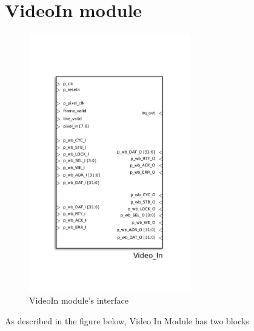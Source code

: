
\section{VideoIn module}
\begin{figure}[H]
\center
\includegraphics[width=7cm]{figs/Video_in.pdf}
\caption{VideoIn module's interface}
\label{VideoIn_interface}
\end{figure}

As described in the figure below, Video In Module has two blocks 

